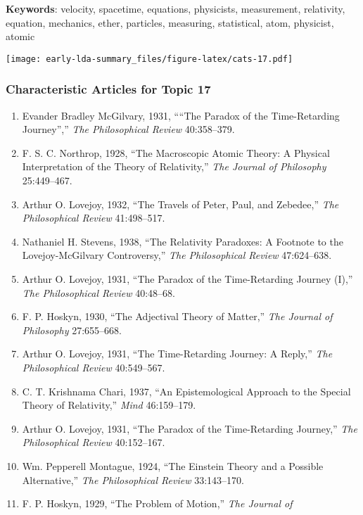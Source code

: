 \documentclass[
]{article}
\begin{document}
\textbf{Keywords}: velocity, spacetime, equations, physicists,
measurement, relativity, equation, mechanics, ether, particles,
measuring, statistical, atom, physicist, atomic

\texttt{[image: early-lda-summary\_files/figure-latex/cats-17.pdf]}
\newpage 

\hypertarget{characteristic-articles-for-topic-17}{%
\subsubsection{Characteristic Articles for Topic
17}\label{characteristic-articles-for-topic-17}}

\begin{enumerate}
\def\labelenumi{\arabic{enumi}.}
\item
  Evander Bradley McGilvary, 1931, ````The Paradox of the Time-Retarding
  Journey'','' \emph{The Philosophical Review} 40:358--379.
\item
  F. S. C. Northrop, 1928, ``The Macroscopic Atomic Theory: A Physical
  Interpretation of the Theory of Relativity,'' \emph{The Journal of
  Philosophy} 25:449--467.
\item
  Arthur O. Lovejoy, 1932, ``The Travels of Peter, Paul, and Zebedee,''
  \emph{The Philosophical Review} 41:498--517.
\item
  Nathaniel H. Stevens, 1938, ``The Relativity Paradoxes: A Footnote to
  the Lovejoy-McGilvary Controversy,'' \emph{The Philosophical Review}
  47:624--638.
\item
  Arthur O. Lovejoy, 1931, ``The Paradox of the Time-Retarding Journey
  (I),'' \emph{The Philosophical Review} 40:48--68.
\item
  F. P. Hoskyn, 1930, ``The Adjectival Theory of Matter,'' \emph{The
  Journal of Philosophy} 27:655--668.
\item
  Arthur O. Lovejoy, 1931, ``The Time-Retarding Journey: A Reply,''
  \emph{The Philosophical Review} 40:549--567.
\item
  C. T. Krishnama Chari, 1937, ``An Epistemological Approach to the
  Special Theory of Relativity,'' \emph{Mind} 46:159--179.
\item
  Arthur O. Lovejoy, 1931, ``The Paradox of the Time-Retarding
  Journey,'' \emph{The Philosophical Review} 40:152--167.
\item
  Wm. Pepperell Montague, 1924, ``The Einstein Theory and a Possible
  Alternative,'' \emph{The Philosophical Review} 33:143--170.
\item
  F. P. Hoskyn, 1929, ``The Problem of Motion,'' \emph{The Journal of
}
\end{enumerate}
\end{document}
